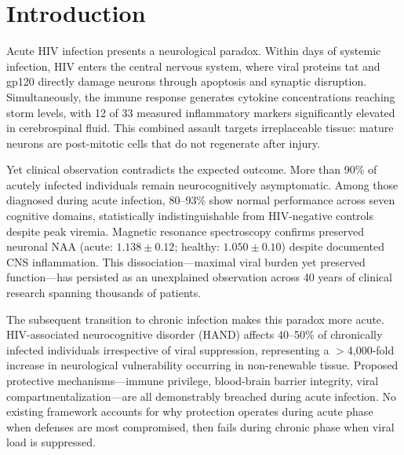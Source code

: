 \documentclass[10pt,a4paper]{article}
\begin{document}
\section{Introduction}

Acute HIV infection presents a neurological paradox. Within days of systemic infection, HIV enters the central nervous system, where viral proteins tat and gp120 directly damage neurons through apoptosis and synaptic disruption\cite{valcour2012,nath2002,kaul1999}. Simultaneously, the immune response generates cytokine concentrations reaching storm levels, with 12 of 33 measured inflammatory markers significantly elevated in cerebrospinal fluid\cite{stacey2009,muema2020}. This combined assault targets irreplaceable tissue: mature neurons are post-mitotic cells that do not regenerate after injury\cite{aranda2012,herrup2007}.

Yet clinical observation contradicts the expected outcome. More than 90\% of acutely infected individuals remain neurocognitively asymptomatic\cite{cheret2025}. Among those diagnosed during acute infection, 80--93\% show normal performance across seven cognitive domains, statistically indistinguishable from HIV-negative controls despite peak viremia\cite{moore2011,cohen2010,schacker1996}. Magnetic resonance spectroscopy confirms preserved neuronal NAA (acute: $1.138 \pm 0.12$; healthy: $1.050 \pm 0.10$) despite documented CNS inflammation\cite{sailasuta2012}. This dissociation---maximal viral burden yet preserved function---has persisted as an unexplained observation across 40 years of clinical research spanning thousands of patients.

The subsequent transition to chronic infection makes this paradox more acute. HIV-associated neurocognitive disorder (HAND) affects 40--50\% of chronically infected individuals irrespective of viral suppression\cite{thompson2024}, representing a $>$4,000-fold increase in neurological vulnerability occurring in non-renewable tissue. Proposed protective mechanisms---immune privilege\cite{carson2006}, blood-brain barrier integrity\cite{banks2006}, viral compartmentalization\cite{joseph2019}---are all demonstrably breached during acute infection\cite{valcour2012,rahimy2015}. No existing framework accounts for why protection operates during acute phase when defenses are most compromised, then fails during chronic phase when viral load is suppressed.
\end{document}
